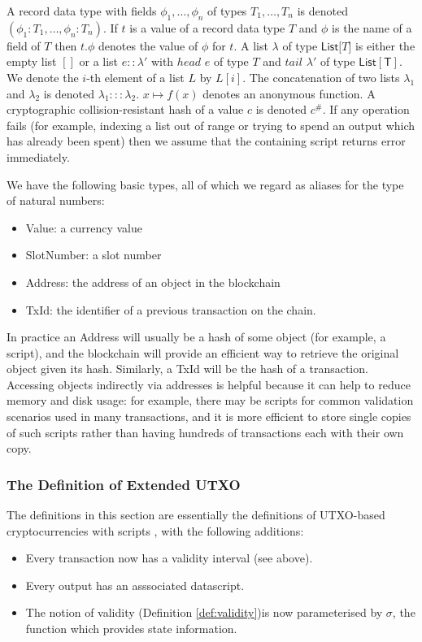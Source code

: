 \documentclass[a4paper]{article}
\theoremstyle{definition}  %
\begin{document}
A record data type with fields $\phi_1, \ldots, \phi_n$ of types $T_1,
\ldots, T_n$ is denoted $(\phi_1 : T_1, \ldots, \phi_n : T_n)$. If $t$
is a value of a record data type $T$ and $\phi$ is the name of a field
of $T$ then $t.\phi$ denotes the value of $\phi$ for $t$. A list
$\lambda$ of type $\mathsf{List[}T\mathsf{]}$ is either the empty list
$[]$ or a list $e :: \lambda'$ with $head$ $e$ of type $T$ and $tail$
$\lambda'$ of type $\mathsf{List[T]}$. We denote the $i$-th element of
a list $L$ by $L[i]$.  The concatenation of two lists $\lambda_1$ and
$\lambda_2$ is denoted $\lambda_1 ::: \lambda_2$. $x \mapsto f(x)$
denotes an anonymous function.  A cryptographic collision-resistant
hash of a value $c$ is denoted $c^{\#}$.  If any operation fails (for
example, indexing a list out of range or trying to spend an output
which has already been spent) then we assume that the containing script
returns \textsf{error} immediately.



We have the following basic types, all of which we regard as aliases for
the type of natural numbers:
\begin{itemize}
\item \textsf{Value}: a currency value
\item \textsf{SlotNumber}: a slot number
  \item \textsf{Address}: the address of an object in the blockchain
\item \textsf{TxId}: the identifier of a previous transaction on the chain.
\end{itemize}

\noindent In practice an \textsf{Address} will usually be a hash of some object
(for example, a script), and the blockchain will provide an efficient
way to retrieve the original object given its hash.  Similarly, a
\textsf{TxId} will be the hash of a transaction.  Accessing objects
indirectly via addresses is helpful because it can help to reduce
memory and disk usage: for example, there may be scripts for common
validation scenarios used in many transactions, and it is more
efficient to store single copies of such scripts rather than having
hundreds of transactions each with their own copy.

\subsubsection{The Definition of Extended UTXO}

The definitions in this section are essentially the definitions of
UTXO-based cryptocurrencies with scripts \cite{Zahnentferner18-UTxO},
with the following additions:
\begin{itemize}
\item Every transaction now has a validity interval (see above).
\item Every output has an asssociated datascript.
\item The notion of validity (Definition
  \ref{def:validity})is now parameterised by $\sigma$, the
  function which provides state information.
\end{itemize}
\end{document}
